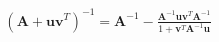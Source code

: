 \documentclass[10pt]{article}
\begin{document}
\begin{align*}\left( \boldsymbol A + \boldsymbol u \boldsymbol v^T \right)^{-1} =
\boldsymbol A^{-1} - \frac{\boldsymbol A^{-1} \boldsymbol u \boldsymbol v^T \boldsymbol A^{-1}}{
1 + \boldsymbol v^T \boldsymbol A^{-1} \boldsymbol u}\end{align*}
\end{document}
